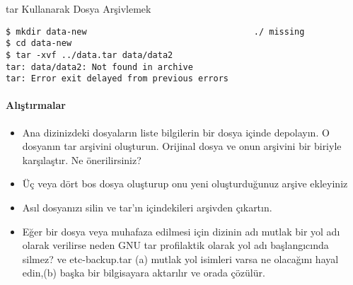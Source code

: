 \documentclass[10pt,a5paper]{book}
\begin{document}
\begin{section}{tar Kullanarak Dosya Arşivlemek}
\begin{verbatim}
$ mkdir data-new                                 ./ missing
$ cd data-new
$ tar -xvf ../data.tar data/data2
tar: data/data2: Not found in archive
tar: Error exit delayed from previous errors
\end{verbatim}
\paragraph{Alıştırmalar}{
\begin{itemize}
 \item Ana dizinizdeki dosyaların liste bilgilerin bir dosya içinde depolayın.
O dosyanın tar arşivini oluşturun. Orijinal dosya ve onun arşivini bir biriyle karşılaştır. Ne önerilirsiniz?
 \item Üç veya dört bos dosya oluşturup onu yeni oluşturduğunuz arşive ekleyiniz
 \item Asıl dosyanızı silin ve tar'ın içindekileri arşivden çıkartın.
 \item Eğer bir dosya veya muhafaza edilmesi için dizinin adı mutlak bir yol adı olarak verilirse neden GNU tar profilaktik olarak yol adı başlangıcında silmez? ve etc-backup.tar (a) mutlak yol isimleri varsa ne olacağını hayal edin,(b) başka bir bilgisayara aktarılır ve orada çözülür.
\end{itemize}}
\end{section}
\end{document}
